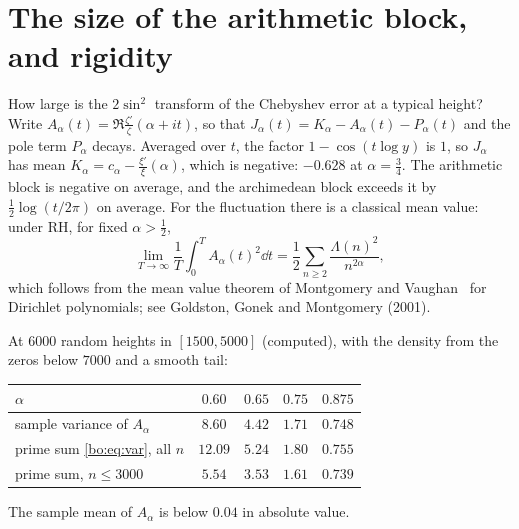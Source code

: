 \section{The size of the arithmetic block, and rigidity}\label{bo:sec:arith}

How large is the $2\sin^2$ transform of the Chebyshev error at a typical height? Write $A_\alpha(t)=\Re\frac{\zeta'}{\zeta}(\alpha+it)$, so that $J_\alpha(t)=K_\alpha-A_\alpha(t)-P_\alpha(t)$ and the pole term $P_\alpha$ decays. Averaged over $t$, the factor $1-\cos(t\log y)$ is $1$, so $J_\alpha$ has mean $K_\alpha=c_\alpha-\frac{\xi'}{\xi}(\alpha)$, which is negative: $-0.628$ at $\alpha=\frac34$. The arithmetic block is negative on average, and the archimedean block exceeds it by $\frac12\log(t/2\pi)$ on average. For the fluctuation there is a classical mean value: under RH, for fixed $\alpha>\frac12$,
\begin{equation}\label{bo:eq:var}
\lim_{T\to\infty}\frac1T\int_0^TA_\alpha(t)^2\dd t=\frac12\sum_{n\ge2}\frac{\Lambda(n)^2}{n^{2\alpha}},
\end{equation}
which follows from the mean value theorem of Montgomery and Vaughan~\cite{MV74} for Dirichlet polynomials; see Goldston, Gonek and Montgomery (2001).%

\begin{computation}\label{bo:comp:var}
At $6000$ random heights in $[1500,5000]$ (computed), with the density from the zeros below $7000$ and a smooth tail:
\begin{center}\small
\begin{tabular}{@{}lcccc@{}}
\toprule
$\alpha$ & $0.60$ & $0.65$ & $0.75$ & $0.875$\\
\midrule
sample variance of $A_\alpha$ & $8.60$ & $4.42$ & $1.71$ & $0.748$\\
prime sum \eqref{bo:eq:var}, all $n$ & $12.09$ & $5.24$ & $1.80$ & $0.755$\\
prime sum, $n\le3000$ & $5.54$ & $3.53$ & $1.61$ & $0.739$\\
\bottomrule
\end{tabular}
\end{center}
The sample mean of $A_\alpha$ is below $0.04$ in absolute value.
\end{computation}

